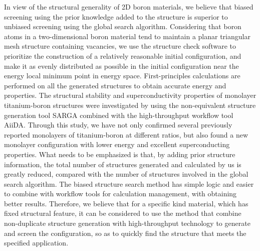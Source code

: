 \documentclass[phd,nobackinfo]{scutthesis}
\begin{document}
\begin{englishabstract}
In view of the structural generality of 2D boron materials, we believe that biased screening using the prior knowledge added to the structure is superior to unbiased screening using the global search algorithm. Considering that boron atoms in a two-dimensional boron material tend to maintain a planar triangular mesh structure containing vacancies, we use the structure check software to prioritize the construction of a relatively reasonable initial configuration, and make it as evenly distributed as possible in the initial configuration near the energy local minimum point in energy space. First-principles calculations are performed on all the generated structures to obtain accurate energy and properties.
The structural stability and superconductivity properties of monolayer titanium-boron structures were investigated by using the non-equivalent structure generation tool SARGA combined with the high-throughput workflow tool AiiDA.
Through this study, we have not only confirmed several previously reported monolayers of titanium-boron at different ratios, but also found a new  monolayer configuration with lower energy and excellent superconducting properties. 
What needs to be emphasized is that, by adding prior structure information, the total number of structures generated and calculated by us is greatly reduced, compared with the number of structures involved in the global search algorithm. 
The biased structure search method has simple logic and easier to combine with workflow tools for calculation management, with obtaining better results. 
Therefore, we believe that for a specific kind material, which has fixed structural feature, it can be considered to use the method that combine non-duplicate structure generation with high-throughput technology to generate and screen the configuration, so as to quickly find the structure that meets the specified application.
\end{englishabstract}
\end{document}
